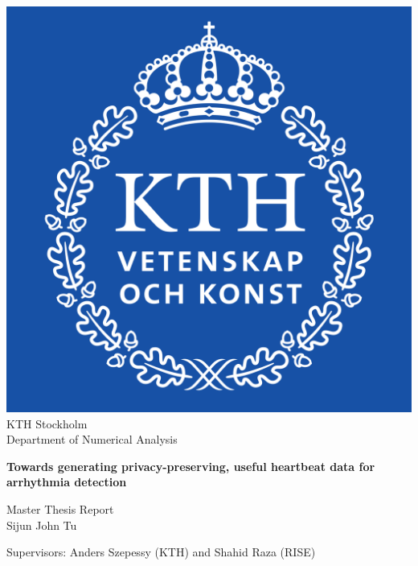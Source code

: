 \begin{titlepage}
	\begin{center}
		\vspace*{1cm}
		\includegraphics[scale=0.1]{pictures/KTH_Royal_Institute_of_Technology_logo.svg.png}\\
		\Large
		KTH Stockholm\\
		Department of Numerical Analysis
		\vspace*{1cm}



		\Huge
		\textbf{Towards generating privacy-preserving, useful heartbeat data for arrhythmia detection
		}
		
		\vspace{0.5cm}
		
		\vspace{1.5cm}
		
		
		\vfill
		
		Master Thesis Report \\
		Sijun John Tu
		\vspace{0.8cm}

		
		\large
		Supervisors: Anders Szepessy (KTH) and Shahid Raza (RISE)\\
		
	\end{center}
\end{titlepage}